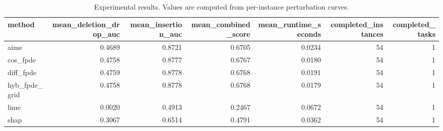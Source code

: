 \begin{table}[t]
\caption{Experimental results. Values are computed from per-instance perturbation curves.}
\label{tab:main_results_computed}
\centering
\begin{tabular}{lrrrrrr}
\toprule
method & mean\_deletion\_drop\_auc & mean\_insertion\_auc & mean\_combined\_score & mean\_runtime\_seconds & completed\_instances & completed\_tasks \\
\midrule
aime & 0.4689 & 0.8721 & 0.6705 & 0.0234 & 54 & 1 \\
cos\_fpde & 0.4758 & 0.8777 & 0.6767 & 0.0180 & 54 & 1 \\
diff\_fpde & 0.4759 & 0.8778 & 0.6768 & 0.0191 & 54 & 1 \\
hyb\_fpde\_grid & 0.4758 & 0.8778 & 0.6768 & 0.0179 & 54 & 1 \\
lime & 0.0020 & 0.4913 & 0.2467 & 0.0672 & 54 & 1 \\
shap & 0.3067 & 0.6514 & 0.4791 & 0.0362 & 54 & 1 \\
\bottomrule
\end{tabular}

\end{table}
